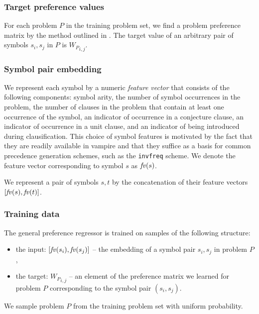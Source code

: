 \documentclass[a4paper]{easychair}
\begin{document}
\subsubsection{Target preference values}
\label{sec:target-preference-values}

For each problem \(P\) in the training problem set,
we find a problem preference matrix by the method outlined in .
The target value of an arbitrary pair of symbols \(s_i, s_j\) in \(P\) is \({W_P}_{i,j}\).

\subsubsection{Symbol pair embedding} \label{sect:embeddings}

We represent each symbol by a numeric \emph{feature vector} that consists of the following components:
symbol arity, %
the number of symbol occurrences in the problem, %
the number of clauses in the problem that contain at least one occurrence of the symbol, %
an indicator of occurrence in a conjecture clause, %
an indicator of occurrence in a unit clause, %
and an indicator of being introduced during clausification. %
This choice of symbol features is motivated by the fact that they
are readily available in %
\gls*{vampire}
and that they suffice as a basis for common precedence generation schemes,
such as the \texttt{invfreq} scheme.
We denote the feature vector corresponding to symbol \(s\) as \(\mathit{fv}(s)\).

We represent a pair of symbols \(s, t\)
by the concatenation of their feature vectors \([\mathit{fv}(s), \mathit{fv}(t)]\).

\subsubsection{Training data}

The general preference regressor is trained on samples of the following structure:

\begin{itemize}
	\item the input: \([\mathit{fv}(s_i), \mathit{fv}(s_j)]\) -- the embedding of a symbol pair \(s_i, s_j\) in problem \(P\),
	\item the target: \({W_P}_{i,j}\) -- an element of the preference matrix we learned for problem \(P\)
	corresponding to the symbol pair \((s_i,s_j)\).
\end{itemize}
We sample problem \(P\) from the training problem set with uniform probability.
\end{document}
